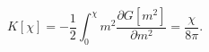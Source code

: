 \begin{equation}
K[\chi] = -\frac{1}{2} \int_0^\chi m^2  \frac {\partial G[m^2]}{\partial
m^2}
= \frac {\chi}{8 \pi}.
 \end{equation}

